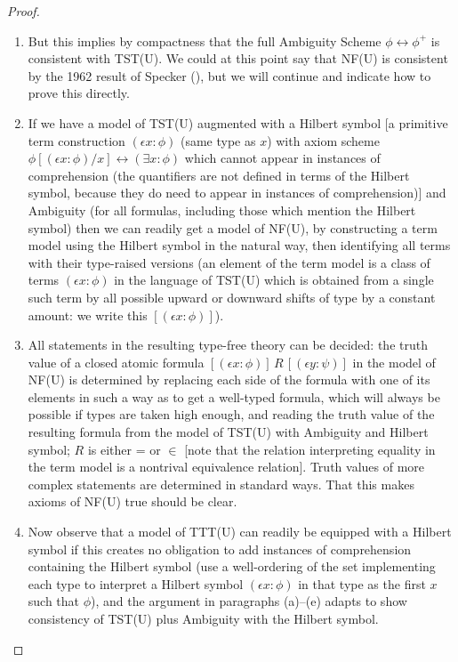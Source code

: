 \documentclass[112pt]{article}
\theoremstyle{definition}
\theoremstyle{remark}
\begin{document}
\begin{proof}
\begin{enumerate}
\begin{enumerate}
\item But this implies by compactness that the full Ambiguity Scheme $\phi \leftrightarrow \phi^+$ is consistent with TST(U).  We could at this point say that  NF(U) is consistent by the 1962 result of Specker (\cite{ambiguity}), but we will continue and indicate how to prove this directly.

\item If we have a model of TST(U) augmented with a Hilbert symbol [a primitive term construction $(\epsilon x:\phi)$ (same type as $x$) with axiom scheme $\phi[(\epsilon x:\phi)/x] \leftrightarrow (\exists x:\phi)$ which cannot appear in instances of comprehension (the quantifiers are not defined in terms of the Hilbert symbol, because they do need to appear in instances of comprehension)] and Ambiguity (for all formulas, including those which mention the Hilbert symbol) then we can readily get a model of NF(U), by constructing a term model using the Hilbert symbol in the natural way, then identifying all terms with their type-raised versions (an element of the term model is a class of terms $(\epsilon x:\phi)$ in the language of TST(U) which is obtained from a single such term by all possible upward or downward shifts of type by a constant amount:  we write this
$[(\epsilon x:\phi)]$).


\item All statements in the resulting type-free theory can be decided:  the truth value of a closed atomic formula $[(\epsilon x:\phi)] \,R\, [(\epsilon y:\psi)]$ in the model of NF(U) is determined by replacing each side of the formula with one of its elements in such a way as to get a well-typed formula, which will always be possible if types are taken high enough, and reading the truth value of the resulting formula  from the model of TST(U) with Ambiguity and Hilbert symbol;  $R$ is either = or $\in$ [note that the relation interpreting equality in the term model is a nontrival equivalence relation].  Truth values of more complex statements are determined in standard ways.  That this makes axioms of NF(U) true should be clear.

\item  Now observe that a model of TTT(U) can readily be equipped with a Hilbert symbol if this creates no obligation to add instances of comprehension
containing the Hilbert symbol (use a well-ordering of the set implementing each type to interpret a Hilbert symbol  $(\epsilon x:\phi)$ in that type as the first $x$ such that $\phi$), and the argument in paragraphs (a)--(e) adapts to show consistency of TST(U) plus Ambiguity with the Hilbert symbol.


\end{enumerate}
\end{enumerate}
\end{proof}
\end{document}
